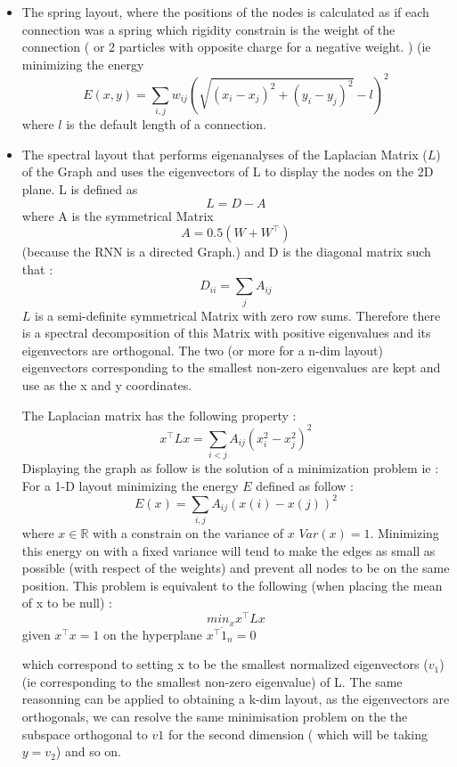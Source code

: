 \begin{itemize}
    \item The spring layout, where the positions of the nodes is calculated as if each connection was a spring which rigidity constrain is the weight of the connection ( or 2 particles with opposite charge for a negative weight. ) (ie minimizing the energy $$ E(x, y) = \sum_{i,j} w_{ij}(\sqrt{(x_i - x_j)^2 + (y_i - y_j)^2} - l)^2 $$ where $l$ is the default length of a connection. 
    \item The spectral layout \cite{koren2003spectral} that performs eigenanalyses of the Laplacian Matrix ($L$) of the Graph and uses the eigenvectors of L to display the nodes on the 2D plane. L is defined as $$ L = D - A $$ where A is the symmetrical Matrix $$ A = 0.5(W + W^\top) $$ (because the RNN is a directed Graph.) and D is the diagonal matrix such that :  $$ D_{ii} = \sum_j A_{ij} $$ 
        $L$ is a semi-definite symmetrical Matrix with zero row sums. Therefore there is a spectral decomposition of this Matrix with positive eigenvalues and its eigenvectors are orthogonal. The two (or more for a n-dim layout) eigenvectors corresponding to the smallest non-zero eigenvalues are kept and use as the x and y coordinates.  

        The Laplacian matrix has the following property : $$x^\top  L x = \sum_{i < j} A_{ij}(x_i^2 - x_j^2)^2 $$
        Displaying the graph as follow is the solution of a minimization problem ie : For a 1-D layout minimizing the energy $E$ defined as follow : 
        $$ E(x) = \sum_{i,j} A_{ij} (x(i) - x(j))^2 $$ where $x \in \mathbb{R} $ with a constrain on the variance of $x$ $Var(x) = 1 $. 
        Minimizing this energy on with a fixed variance will tend to make the edges as small as possible (with respect of the weights) and prevent all nodes to be on the same position. 
    This problem is equivalent to the following (when placing the mean of x to be null) : 
    $$ min_x x^\top L x $$
    given $ x^\top x = 1 $
    on the hyperplane $x^\top \dot 1_n = 0 $

    which correspond to setting x to be the smallest normalized eigenvectors ($v_1$) (ie corresponding to the smallest non-zero eigenvalue) of L.
    The same reasonning can be applied to obtaining a k-dim layout, as the eigenvectors are orthogonals, we can resolve the same minimisation problem on the the subspace orthogonal to $v1$ for the second dimension ( which will be taking $y = v_2$) and so on. 
\end{itemize}


